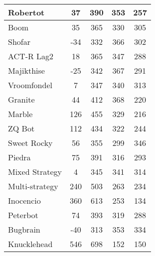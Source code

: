 \begin{table*}
\begin{tabular}{|l|c|c|c|c|}
Robertot & 37 & 390 & 353 & 257 \\ \hline 
Boom & 35 & 365 & 330 & 305 \\ \hline 
Shofar & -34 & 332 & 366 & 302 \\ \hline 
ACT-R Lag2 & 18 & 365 & 347 & 288 \\ \hline 
Majikthise & -25 & 342 & 367 & 291 \\ \hline 
Vroomfondel & 7 & 347 & 340 & 313 \\ \hline 
Granite & 44 & 412 & 368 & 220 \\ \hline 
Marble & 126 & 455 & 329 & 216 \\ \hline 
ZQ Bot & 112 & 434 & 322 & 244 \\ \hline 
Sweet Rocky & 56 & 355 & 299 & 346 \\ \hline 
Piedra & 75 & 391 & 316 & 293 \\ \hline 
Mixed Strategy & 4 & 345 & 341 & 314 \\ \hline 
Multi-strategy & 240 & 503 & 263 & 234 \\ \hline 
Inocencio & 360 & 613 & 253 & 134 \\ \hline 
Peterbot & 74 & 393 & 319 & 288 \\ \hline 
Bugbrain & -40 & 313 & 353 & 334 \\ \hline 
Knucklehead & 546 & 698 & 152 & 150 \\ \hline
        \end{tabular}
    \end{table*}